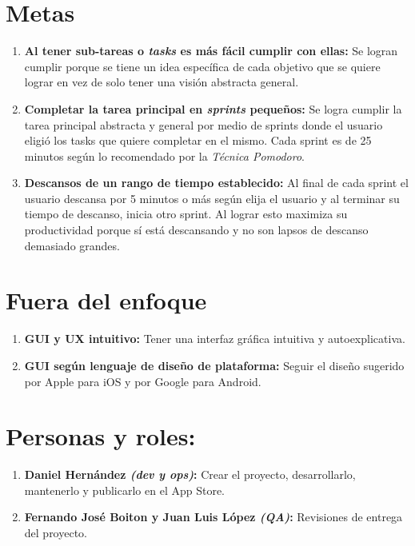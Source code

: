\documentclass[]{article}
\begin{document}
\section{Metas}
\begin{enumerate}
	\item \textbf{Al tener sub-tareas o \textit{tasks} es más fácil cumplir con ellas:} Se logran cumplir porque se tiene un idea específica de cada objetivo que se quiere lograr en vez de solo tener una visión abstracta general.
	
	\item \textbf{Completar la tarea principal en \textit{sprints} pequeños:} Se logra cumplir la tarea principal abstracta y general por medio de sprints donde el usuario eligió los tasks que quiere completar en el mismo. Cada sprint es de 25 minutos según lo recomendado por la \textit{Técnica Pomodoro}.
	
	\item \textbf{Descansos de un rango de tiempo establecido:} Al final de cada sprint el usuario descansa por 5 minutos o más según elija el usuario y al terminar su tiempo de descanso, inicia otro sprint. Al lograr esto maximiza su productividad porque sí está descansando y no son lapsos de descanso demasiado grandes.
\end{enumerate}

\section{Fuera del enfoque}
\begin{enumerate}
	\item \textbf{GUI y UX intuitivo:} Tener una interfaz gráfica intuitiva y autoexplicativa.
	\item \textbf{GUI según lenguaje de diseño de plataforma:} Seguir el diseño sugerido por Apple para iOS y por Google para Android.
\end{enumerate}

\section{Personas y roles:}
\begin{enumerate}
	\item \textbf{Daniel Hernández \textit{(dev y ops)}:} Crear el proyecto, desarrollarlo, mantenerlo y publicarlo en el App Store. 
	\item \textbf{Fernando José Boiton y Juan Luis López \textit{(QA)}:} Revisiones de entrega del proyecto.  
\end{enumerate}
\end{document}
